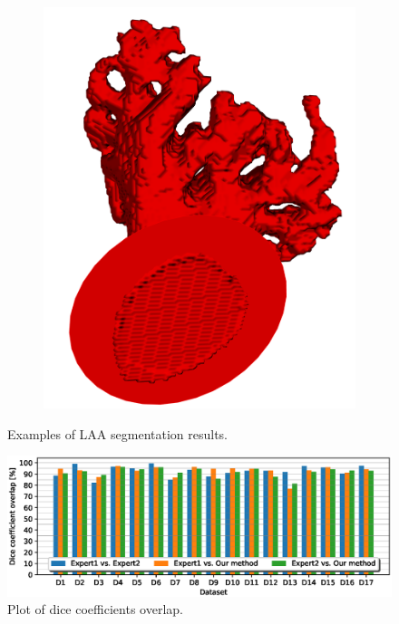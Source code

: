 \documentclass[review]{elsarticle}
\begin{document}
\begin{figure}[t]
\begin{subfigure}[b]{.12\linewidth}
    \includegraphics[width=\textwidth]{fig11_8.png}
  \end{subfigure}%
  \caption{Examples of LAA segmentation results.}
  \label{fig:segmentation_results}
\end{figure}



\begin{figure}[t]
  \centering
  \includegraphics[width=\linewidth]{fig12.eps}
  \caption{Plot of dice coefficients overlap.}
  \label{fig:dices_plot}       %
\end{figure}
\end{document}
